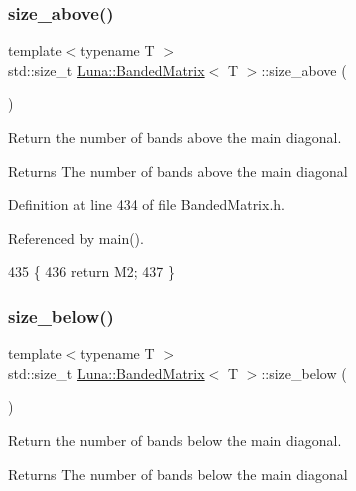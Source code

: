 \subsubsection{\texorpdfstring{size\+\_\+above()}{size\_above()}}
{\footnotesize\ttfamily template$<$typename T $>$ \\
std\+::size\+\_\+t \hyperlink{classLuna_1_1BandedMatrix}{Luna\+::\+Banded\+Matrix}$<$ T $>$\+::size\+\_\+above (\begin{DoxyParamCaption}{ }\end{DoxyParamCaption})\hspace{0.3cm}{\ttfamily [inline]}}



Return the number of bands above the main diagonal. 

\begin{DoxyReturn}{Returns}
The number of bands above the main diagonal 
\end{DoxyReturn}


Definition at line 434 of file Banded\+Matrix.\+h.



Referenced by main().


\begin{DoxyCode}
435   \{
436     \textcolor{keywordflow}{return} M2;
437   \}
\end{DoxyCode}
\mbox{\label{classLuna_1_1BandedMatrix_ae61a6a5f054fad917339f6022f4bbca7}} 
\subsubsection{\texorpdfstring{size\+\_\+below()}{size\_below()}}
{\footnotesize\ttfamily template$<$typename T $>$ \\
std\+::size\+\_\+t \hyperlink{classLuna_1_1BandedMatrix}{Luna\+::\+Banded\+Matrix}$<$ T $>$\+::size\+\_\+below (\begin{DoxyParamCaption}{ }\end{DoxyParamCaption})\hspace{0.3cm}{\ttfamily [inline]}}



Return the number of bands below the main diagonal. 

\begin{DoxyReturn}{Returns}
The number of bands below the main diagonal 
\end{DoxyReturn}


